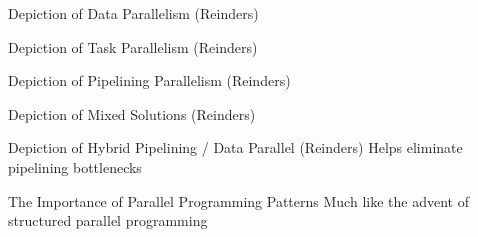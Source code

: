 \documentclass{beamer}
\begin{document}

\begin{frame}{Depiction of Data Parallelism (Reinders)}


\end{frame}



\begin{frame}{Depiction of Task Parallelism (Reinders)}


\end{frame}



\begin{frame}{Depiction of Pipelining Parallelism (Reinders)}


\end{frame}



\begin{frame}{Depiction of Mixed Solutions (Reinders)}


\end{frame}




\begin{frame}{Depiction of Hybrid Pipelining / Data Parallel (Reinders)}
\noindent Helps eliminate pipelining bottlenecks

\end{frame}



\begin{frame}{The Importance of Parallel Programming Patterns}
\noindent Much like the advent of structured parallel programming

\end{frame}


\end{document}
